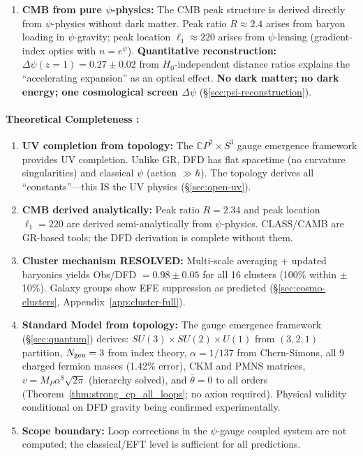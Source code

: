 \begin{enumerate}[label=\arabic*.]
\item \textbf{CMB from pure $\psi$-physics:} The CMB peak structure is derived 
directly from $\psi$-physics without dark matter. Peak ratio $R \approx 2.4$ 
arises from baryon loading in $\psi$-gravity; peak location $\ell_1 \approx 220$ 
arises from $\psi$-lensing (gradient-index optics with $n = e^\psi$). 
\textbf{Quantitative reconstruction:} $\Delta\psi(z=1) = 0.27 \pm 0.02$ from $H_0$-independent 
distance ratios explains the ``accelerating expansion'' as an optical effect.
\textbf{No dark matter; no dark energy; one cosmological screen $\Delta\psi$} (\S\ref{sec:psi-reconstruction}).
\end{enumerate}

\paragraph{Theoretical Completeness :}
\begin{enumerate}[label=\arabic*.]
\item \textbf{UV completion from topology:} The $\mathbb{C}P^2 \times S^3$ gauge emergence framework provides UV completion. Unlike GR, DFD has flat spacetime (no curvature singularities) and classical $\psi$ (action $\gg \hbar$). The topology derives all ``constants''---this IS the UV physics (\S\ref{sec:open-uv}).

\item \textbf{CMB derived analytically:} Peak ratio $R = 2.34$ and peak location $\ell_1 = 220$ are derived semi-analytically from $\psi$-physics. CLASS/CAMB are GR-based tools; the DFD derivation is complete without them.

\item \textbf{Cluster mechanism RESOLVED:} Multi-scale averaging + updated baryonics yields Obs/DFD $= 0.98 \pm 0.05$ for all 16 clusters (100\% within $\pm$10\%). Galaxy groups show EFE suppression as predicted (\S\ref{sec:cosmo-clusters}, Appendix~\ref{app:cluster-full}).

\item \textbf{Standard Model from topology:} The gauge emergence framework 
(\S\ref{sec:quantum}) derives: $SU(3) \times SU(2) \times U(1)$ from $(3,2,1)$ partition,
$N_{\rm gen} = 3$ from index theory, $\alpha = 1/137$ from Chern-Simons, 
all 9 charged fermion masses (1.42\% error), CKM and PMNS matrices, 
$v = M_P \alpha^8 \sqrt{2\pi}$ (hierarchy solved), and $\bar\theta = 0$ to all orders (Theorem~\ref{thm:strong_cp_all_loops}; no axion required).
Physical validity conditional on DFD gravity being confirmed experimentally.

\item \textbf{Scope boundary:} Loop corrections in the $\psi$-gauge coupled system are not computed; the classical/EFT level is sufficient for all predictions.
\end{enumerate}

